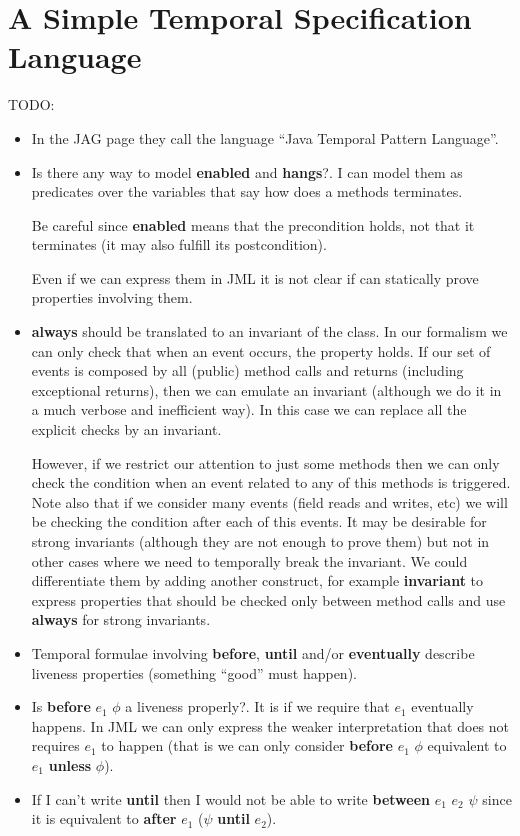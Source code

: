 \documentclass[a4paper,10pt]{article}
\theoremstyle{definition}
\begin{document}
\section{A Simple Temporal Specification Language} %
TODO: 
\begin{itemize}
  \item In the JAG page they call the language ``Java Temporal Pattern Language''.
  \item Is there any way to model \textbf{enabled} and \textbf{hangs}?. I can model them as predicates over
the variables that say how does a methods terminates.

Be careful since \textbf{enabled} means that the precondition holds, not that it terminates (it may also
fulfill its postcondition).

Even if we can express them in JML it is not clear if can statically prove properties involving them.
  \item \textbf{always} should be translated to an invariant of the class. In our formalism we can only check
that when an event occurs, the property holds.
If our set of events is composed by all (public) method calls and returns (including exceptional returns),
then we can emulate an invariant (although we do it in a much verbose and inefficient way). In this case we
can replace all the explicit checks by an invariant.

However, if we restrict our attention to just some methods then we can only check the condition when an event
related to any of this methods is triggered. Note also that if we consider many events (field reads and
writes, etc) we will be checking the condition after each of this events. It may be desirable for
strong invariants (although they are not enough to prove them) but not in other cases where we need to
temporally break the invariant. We could differentiate them by adding another construct, for example
\textbf{invariant} to express properties that should be checked only between method calls and use
\textbf{always} for strong invariants.

  \item Temporal formulae involving \textbf{before}, \textbf{until} and/or
\textbf{eventually} describe liveness properties (something ``good'' must
happen).
  \item Is \textbf{before} $e_1$ $\phi$ a liveness properly?. It is if we
require that $e_1$ eventually happens. In JML we can only express the weaker
interpretation that does not requires $e_1$ to happen (that is we can only
consider \textbf{before} $e_1$ $\phi$ equivalent to $e_1$ \textbf{unless}
$\phi$).
  \item If I can't write \textbf{until} then I would not be able to write
\textbf{between} $e_1$ $e_2$ $\psi$ since it is equivalent to \textbf{after}
$e_1$ ($\psi$ \textbf{until} $e_2$).
\end{itemize}
\end{document}

